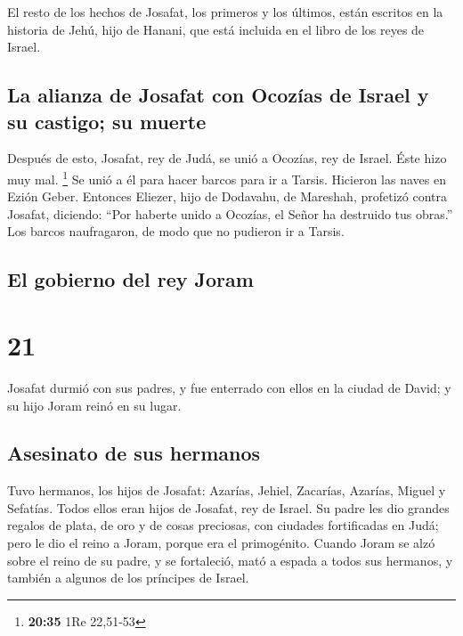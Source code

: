  El resto de los hechos de Josafat, los primeros y los
últimos, están escritos en la historia de Jehú, hijo de Hanani, que está
incluida en el libro de los reyes de Israel.

\hypertarget{la-alianza-de-josafat-con-ocozuxedas-de-israel-y-su-castigo-su-muerte}{%
\subsection{La alianza de Josafat con Ocozías de Israel y su castigo; su
muerte}\label{la-alianza-de-josafat-con-ocozuxedas-de-israel-y-su-castigo-su-muerte}}

 Después de esto, Josafat, rey de Judá, se unió a
Ocozías, rey de Israel. Éste hizo muy mal. \footnote{\textbf{20:35} 1Re
  22,51-53}  Se unió a él para hacer barcos para ir a
Tarsis. Hicieron las naves en Ezión Geber.  Entonces
Eliezer, hijo de Dodavahu, de Mareshah, profetizó contra Josafat,
diciendo: ``Por haberte unido a Ocozías, el Señor ha destruido tus
obras.'' Los barcos naufragaron, de modo que no pudieron ir a Tarsis.

\hypertarget{el-gobierno-del-rey-joram}{%
\subsection{El gobierno del rey Joram}\label{el-gobierno-del-rey-joram}}

\hypertarget{section-20}{%
\section{21}\label{section-20}}

 Josafat durmió con sus padres, y fue enterrado con ellos
en la ciudad de David; y su hijo Joram reinó en su lugar.

\hypertarget{asesinato-de-sus-hermanos}{%
\subsection{Asesinato de sus hermanos}\label{asesinato-de-sus-hermanos}}

 Tuvo hermanos, los hijos de Josafat: Azarías, Jehiel,
Zacarías, Azarías, Miguel y Sefatías. Todos ellos eran hijos de Josafat,
rey de Israel.  Su padre les dio grandes regalos de plata,
de oro y de cosas preciosas, con ciudades fortificadas en Judá; pero le
dio el reino a Joram, porque era el primogénito.  Cuando
Joram se alzó sobre el reino de su padre, y se fortaleció, mató a espada
a todos sus hermanos, y también a algunos de los príncipes de Israel.

